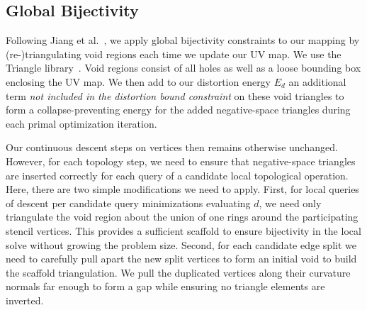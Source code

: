 %

\subsection{Global Bijectivity}
\label{sec:bijectivity}

Following Jiang et al.\ , we apply global bijectivity constraints to our mapping by (re-)triangulating void regions each time we update our UV map. We use the Triangle library~\cite{shewchuk1996triangle}. Void regions consist of all holes as well as a loose bounding box enclosing the UV map.
We then add to our distortion energy $E_d$ an additional term \emph{not included in the distortion bound constraint} on these void triangles to form a collapse-preventing energy for the added negative-space triangles during each primal optimization iteration.

Our continuous descent steps on vertices then remains otherwise unchanged.
However, for each topology step, we need to ensure that negative-space triangles are inserted correctly for each query of a candidate local topological operation. Here, there are two simple modifications we need to apply. First, for local queries of descent per candidate query minimizations evaluating $d$, we need only triangulate the void region about the union of one rings around the participating stencil vertices. This provides a sufficient scaffold to ensure bijectivity in the local solve without growing the problem size. Second, for each candidate edge split we need to carefully pull apart the new split vertices to form an initial void to build the scaffold triangulation. We pull the duplicated vertices along their curvature normals far enough to form a gap while ensuring no triangle elements are inverted. 


